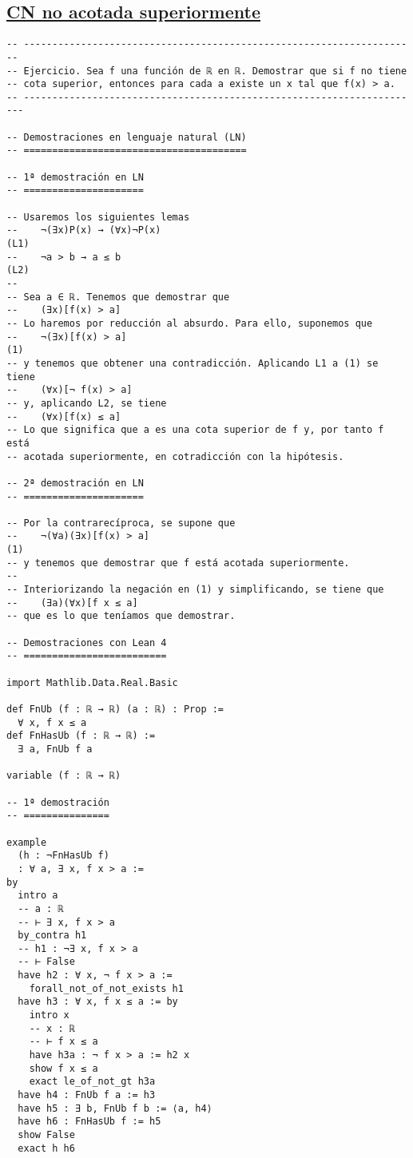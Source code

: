 \subsection{\href{./src/Logica/CN\_no\_acotada\_superiormente.lean}{CN no acotada superiormente}}
\label{sec:org6e65b35}
\begin{verbatim}
-- ---------------------------------------------------------------------
-- Ejercicio. Sea f una función de ℝ en ℝ. Demostrar que si f no tiene
-- cota superior, entonces para cada a existe un x tal que f(x) > a.
-- ----------------------------------------------------------------------

-- Demostraciones en lenguaje natural (LN)
-- =======================================

-- 1ª demostración en LN
-- =====================

-- Usaremos los siguientes lemas
--    ¬(∃x)P(x) → (∀x)¬P(x)                                          (L1)
--    ¬a > b → a ≤ b                                                 (L2)
--
-- Sea a ∈ ℝ. Tenemos que demostrar que
--    (∃x)[f(x) > a]
-- Lo haremos por reducción al absurdo. Para ello, suponemos que
--    ¬(∃x)[f(x) > a]                                                (1)
-- y tenemos que obtener una contradicción. Aplicando L1 a (1) se tiene
--    (∀x)[¬ f(x) > a]
-- y, aplicando L2, se tiene
--    (∀x)[f(x) ≤ a]
-- Lo que significa que a es una cota superior de f y, por tanto f está
-- acotada superiormente, en cotradicción con la hipótesis.

-- 2ª demostración en LN
-- =====================

-- Por la contrarecíproca, se supone que
--    ¬(∀a)(∃x)[f(x) > a]                                             (1)
-- y tenemos que demostrar que f está acotada superiormente.
--
-- Interiorizando la negación en (1) y simplificando, se tiene que
--    (∃a)(∀x)[f x ≤ a]
-- que es lo que teníamos que demostrar.

-- Demostraciones con Lean 4
-- =========================

import Mathlib.Data.Real.Basic

def FnUb (f : ℝ → ℝ) (a : ℝ) : Prop :=
  ∀ x, f x ≤ a
def FnHasUb (f : ℝ → ℝ) :=
  ∃ a, FnUb f a

variable (f : ℝ → ℝ)

-- 1ª demostración
-- ===============

example
  (h : ¬FnHasUb f)
  : ∀ a, ∃ x, f x > a :=
by
  intro a
  -- a : ℝ
  -- ⊢ ∃ x, f x > a
  by_contra h1
  -- h1 : ¬∃ x, f x > a
  -- ⊢ False
  have h2 : ∀ x, ¬ f x > a :=
    forall_not_of_not_exists h1
  have h3 : ∀ x, f x ≤ a := by
    intro x
    -- x : ℝ
    -- ⊢ f x ≤ a
    have h3a : ¬ f x > a := h2 x
    show f x ≤ a
    exact le_of_not_gt h3a
  have h4 : FnUb f a := h3
  have h5 : ∃ b, FnUb f b := ⟨a, h4⟩
  have h6 : FnHasUb f := h5
  show False
  exact h h6


\end{verbatim}
